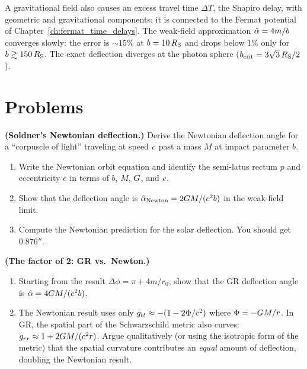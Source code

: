 A gravitational field also causes an excess travel time $\Delta T$, the
Shapiro delay, with geometric and gravitational components; it is
connected to the Fermat potential of Chapter~\ref{ch:fermat_time_delays}.
The weak-field approximation $\hat{\alpha} = 4m/b$ converges slowly: the
error is $\sim 15\%$ at $b = 10\,R_{\mathrm{S}}$ and drops below $1\%$ only for
$b \gtrsim 150\,R_{\mathrm{S}}$.  The exact deflection diverges at the photon sphere
($b_{\mathrm{crit}} = 3\sqrt{3}\,R_{\mathrm{S}}/2$).


\section{Problems}
\label{sec:deflection_problems}

\begin{exercise}
\label{ex:soldner_full}
\textbf{(Soldner's Newtonian deflection.)}
Derive the Newtonian deflection angle for a ``corpuscle of light''
traveling at speed $c$ past a mass $M$ at impact parameter $b$.
\begin{enumerate}[label=(\alph*)]
    \item Write the Newtonian orbit equation and identify the semi-latus
          rectum $p$ and eccentricity $e$ in terms of $b$, $M$, $G$,
          and $c$.
    \item Show that the deflection angle is
          $\hat{\alpha}_{\mathrm{Newton}} = 2G M /
          (c^2 b)$ in the weak-field limit.
    \item Compute the Newtonian prediction for the solar deflection.  You
          should get $0.876''$.
\end{enumerate}
\end{exercise}

\begin{exercise}
\label{ex:factor_of_two}
\textbf{(The factor of 2: GR vs.\ Newton.)}
\begin{enumerate}[label=(\alph*)]
    \item Starting from the result $\Delta\phi = \pi + 4m/r_0$, show that
          the GR deflection angle is $\hat{\alpha} = 4G M /
          (c^2 b)$.
    \item The Newtonian result uses only $g_{tt} \approx -(1 - 2\Phi/
          c^2)$ where $\Phi = -G M/r$.  In GR, the
          spatial part of the Schwarzschild metric also curves:
          $g_{rr} \approx 1 + 2G M/(c^2 r)$.
          Argue qualitatively (or using the isotropic form of the metric)
          that the spatial curvature contributes an \textit{equal} amount
          of deflection, doubling the Newtonian result.
\end{enumerate}
\end{exercise}

